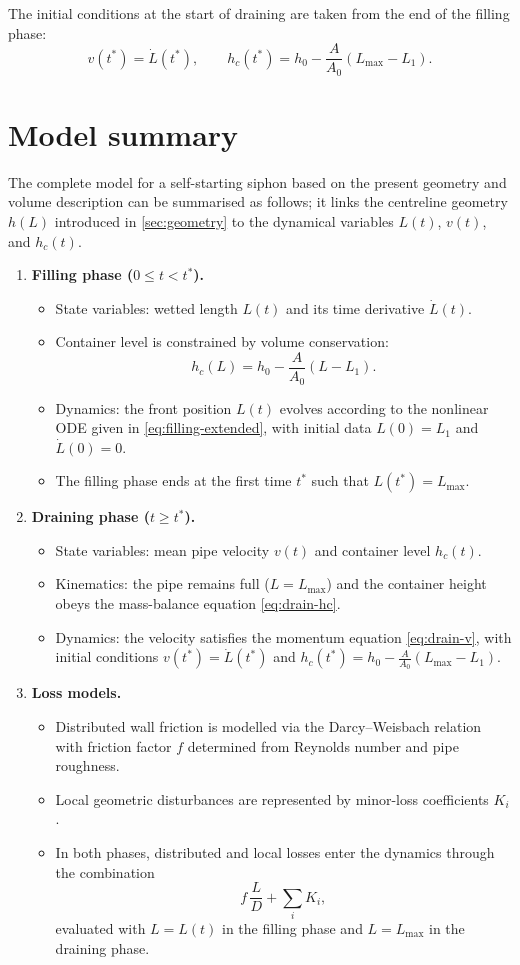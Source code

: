 \documentclass[11pt]{article}
\begin{document}
The initial conditions at the start of draining are taken from the end of the filling phase:
\[
  v(t^*) = \dot L(t^*),\qquad
  h_c(t^*) = h_0 - \frac{A}{A_0}(L_{\max} - L_1).
\]

\section{Model summary}

The complete model for a self-starting siphon based on the present geometry and volume
description can be summarised as follows; it links the centreline geometry $h(L)$ introduced in \cref{sec:geometry} to the dynamical variables $L(t)$, $v(t)$, and $h_c(t)$.
\begin{enumerate}
  \item \textbf{Filling phase ($0 \le t < t^*$).}
    \begin{itemize}
      \item State variables: wetted length $L(t)$ and its time derivative $\dot L(t)$.
      \item Container level is constrained by volume conservation:
            \[
              h_c(L) = h_0 - \frac{A}{A_0}(L - L_1).
            \]
      \item Dynamics: the front position $L(t)$ evolves according to the nonlinear ODE
            given in \eqref{eq:filling-extended},
            with initial data $L(0) = L_1$ and $\dot L(0) = 0$.
      \item The filling phase ends at the first time $t^*$ such that $L(t^*) = L_{\max}$.
    \end{itemize}
  \item \textbf{Draining phase ($t \ge t^*$).}
    \begin{itemize}
      \item State variables: mean pipe velocity $v(t)$ and container level $h_c(t)$.
      \item Kinematics: the pipe remains full ($L = L_{\max}$) and the container height obeys
            the mass-balance equation \eqref{eq:drain-hc}.
      \item Dynamics: the velocity satisfies the momentum equation \eqref{eq:drain-v},
            with initial conditions
            $v(t^*) = \dot L(t^*)$ and
            $h_c(t^*) = h_0 - \frac{A}{A_0}(L_{\max} - L_1)$.
    \end{itemize}
  \item \textbf{Loss models.}
    \begin{itemize}
      \item Distributed wall friction is modelled via the Darcy--Weisbach relation with
            friction factor $f$ determined from Reynolds number and pipe roughness.
      \item Local geometric disturbances are represented by minor-loss coefficients $K_i$.
      \item In both phases, distributed and local losses enter the dynamics through the
            combination
            \[
              f\,\frac{L}{D} + \sum_i K_i,
            \]
            evaluated with $L = L(t)$ in the filling phase and $L = L_{\max}$ in the
            draining phase.
    \end{itemize}
\end{enumerate}
\end{document}
